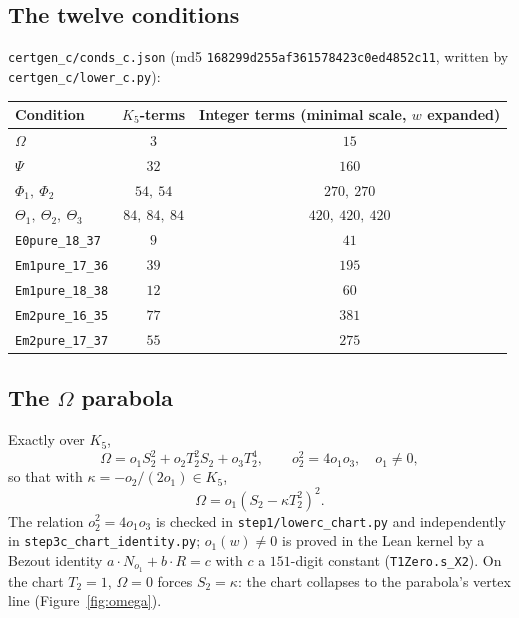 \documentclass[a4paper,11pt]{article}
\theoremstyle{plain}
\theoremstyle{definition}
\theoremstyle{remark}
\begin{document}
\subsection{The twelve conditions}\label{sec:twelve}

\texttt{certgen\_c/conds\_c.json} (md5 \texttt{168299d255af361578423c0ed4852c11}, written by \texttt{certgen\_c/lower\_c.py}):

\begin{center}
\begin{tabular}{lcc}
\toprule
Condition & $K_5$-terms & Integer terms (minimal scale, $w$ expanded) \\
\midrule
$\Omega$ & $3$ & $15$ \\
$\Psi$ & $32$ & $160$ \\
$\Phi_1,\ \Phi_2$ & $54,\ 54$ & $270,\ 270$ \\
$\Theta_1,\ \Theta_2,\ \Theta_3$ & $84,\ 84,\ 84$ & $420,\ 420,\ 420$ \\
\texttt{E0pure\_18\_37} & $9$ & $41$ \\
\texttt{Em1pure\_17\_36} & $39$ & $195$ \\
\texttt{Em1pure\_18\_38} & $12$ & $60$ \\
\texttt{Em2pure\_16\_35} & $77$ & $381$ \\
\texttt{Em2pure\_17\_37} & $55$ & $275$ \\
\bottomrule
\end{tabular}
\end{center}

\subsection{\texorpdfstring{The $\Omega$ parabola}{The Omega parabola}}\label{sec:omega}

Exactly over $K_5$,
\begin{equation}\label{eq:omega}
\Omega=o_1S_2^2+o_2T_2^2S_2+o_3T_2^4,\qquad o_2^2=4o_1o_3,\quad o_1\ne0,
\end{equation}
so that with $\kappa=-o_2/(2o_1)\in K_5$,
\begin{equation}\label{eq:omegafactor}
\Omega=o_1(S_2-\kappa T_2^2)^2.
\end{equation}
The relation $o_2^2=4o_1o_3$ is checked in \texttt{step1/lowerc\_chart.py} and independently in \texttt{step3c\_chart\_identity.py}; $o_1(w)\ne0$ is proved in the Lean kernel by a Bezout identity $a\cdot N_{o_1}+b\cdot R=c$ with $c$ a $151$-digit constant (\texttt{T1Zero.s\_X2}). On the chart $T_2=1$, $\Omega=0$ forces $S_2=\kappa$: the chart collapses to the parabola's vertex line (Figure~\ref{fig:omega}).
\end{document}
